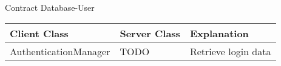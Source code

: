 \begin{subsubsection}{Contract Database-User}
	\begin{tabular}{l l l }
	  Client Class & Server Class & Explanation\\ \hline
	  AuthenticationManager & TODO & Retrieve login data\\
	\end{tabular}
\end{subsubsection}